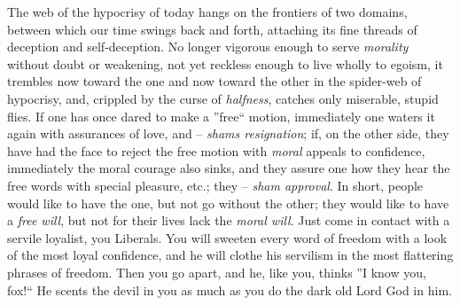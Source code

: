 \documentclass[12pt,a4paper]{book}
\begin{document}
The web of the hypocrisy of today hangs on the frontiers of two domains, 
between which our time swings back and forth, attaching its fine threads of 
deception and self-deception. No longer vigorous enough to serve 
\textit{morality} without doubt or weakening, not yet reckless enough to live 
wholly to egoism, it trembles now toward the one and now toward the other in 
the spider-web of hypocrisy, and, crippled by the curse of \textit{halfness}, 
catches only miserable, stupid flies. If one has once dared to make a 
''free`` motion, immediately one waters it again with assurances of love, 
and -- \textit{shams resignation}; if, on the other side, they have had the 
face to reject the free motion with \textit{moral} appeals to confidence, 
immediately the moral courage also sinks, and they assure one how they hear 
the free words with special pleasure, etc.; they -- \textit{sham approval}. In 
short, people would like to have the one, but not go without the other; they 
would like to have a \textit{free will}, but not for their lives lack the 
\textit{moral will}. Just come in contact with a servile loyalist, you 
Liberals. You will sweeten every word of freedom with a look of the most loyal 
confidence, and he will clothe his servilism in the most flattering phrases of 
freedom. Then you go apart, and he, like you, thinks ''I know you, fox!`` He 
scents the devil in you as much as you do the dark old Lord God in him.
\end{document}
